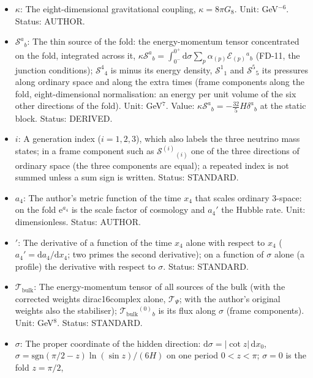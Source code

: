 \documentclass[
  10pt,
]{article}
\providecommand{\tightlist}{%
  \setlength{\itemsep}{0pt}\setlength{\parskip}{0pt}}
\begin{document}
\begin{itemize}
\tightlist
\item
  \(\kappa\): The eight-dimensional gravitational coupling,
  \(\kappa = 8\pi G_8\). Unit: GeV\(^{-6}\). Status: AUTHOR.
\item
  \(\mathcal{S}^a{}_b\): The thin source of the fold: the
  energy-momentum tensor concentrated on the fold, integrated across it,
  \(\kappa\mathcal{S}^a{}_b = \int_{0^-}^{0^+}\mathrm{d}\sigma\sum_p\alpha_{(p)}\mathcal{E}_{(p)}{}^a{}_b\)
  (FD-11, the junction conditions); \(\mathcal{S}^4{}_4\) is minus its
  energy density, \(\mathcal{S}^1{}_1\) and \(\mathcal{S}^5{}_5\) its
  pressures along ordinary space and along the extra times (frame
  components along the fold, eight-dimensional normalisation: an energy
  per unit volume of the six other directions of the fold). Unit:
  GeV\(^7\). Value:
  \(\kappa\mathcal{S}^a{}_b = -\frac{32}{5}H\delta^a{}_b\) at the static
  block. Status: DERIVED.
\item
  \(i\): A generation index (\(i = 1, 2, 3\)), which also labels the
  three neutrino mass states; in a frame component such as
  \(\mathcal{S}^{(i)}{}_{(i)}\) one of the three directions of ordinary
  space (the three components are equal); a repeated index is not summed
  unless a sum sign is written. Status: STANDARD.
\item
  \(a_4\): The author's metric function of the time \(x_4\) that scales
  ordinary 3-space: on the fold \(\mathrm{e}^{a_4}\) is the scale factor
  of cosmology and \(a_4'\) the Hubble rate. Unit: dimensionless.
  Status: AUTHOR.
\item
  \({}'\): The derivative of a function of the time \(x_4\) alone with
  respect to \(x_4\) (\(a_4' = \mathrm{d}a_4/\mathrm{d}x_4\); two primes
  the second derivative); on a function of \(\sigma\) alone (a profile)
  the derivative with respect to \(\sigma\). Status: STANDARD.
\item
  \(\mathcal{T}_{\mathrm{bulk}}\): The energy-momentum tensor of all
  sources of the bulk (with the corrected weights dirac16complex alone,
  \(\mathcal{T}_\Psi\); with the author's original weights also the
  stabiliser); \(\mathcal{T}_{\mathrm{bulk}}{}^{(0)}{}_b\) is its flux
  along \(\sigma\) (frame components). Unit: GeV\(^8\). Status:
  STANDARD.
\item
  \(\sigma\): The proper coordinate of the hidden direction:
  \(\mathrm{d}\sigma = \lvert\cot z\rvert\,\mathrm{d}x_0\),
  \(\sigma = \mathrm{sgn}(\pi/2 - z)\ln(\sin z)/(6H)\) on one period
  \(0 < z < \pi\); \(\sigma = 0\) is the fold \(z = \pi/2\),

\end{itemize}
\end{document}
